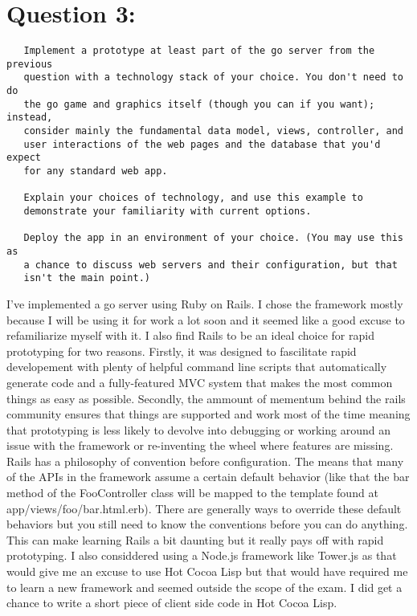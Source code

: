 \documentclass[11pt]{article}
\begin{document}
  
\section*{Question 3:}
\label{sec-3}

  
\begin{verbatim}
   Implement a prototype at least part of the go server from the previous
   question with a technology stack of your choice. You don't need to do
   the go game and graphics itself (though you can if you want); instead,
   consider mainly the fundamental data model, views, controller, and
   user interactions of the web pages and the database that you'd expect
   for any standard web app. 
   
   Explain your choices of technology, and use this example to
   demonstrate your familiarity with current options.
   
   Deploy the app in an environment of your choice. (You may use this as
   a chance to discuss web servers and their configuration, but that
   isn't the main point.)
\end{verbatim}

  
  I've implemented a go server using Ruby on Rails.  I chose the
  framework mostly because I will be using it for work a lot soon and
  it seemed like a good excuse to refamiliarize myself with it.  I
  also find Rails to be an ideal choice for rapid prototyping for two
  reasons.  Firstly, it was designed to fascilitate rapid developement
  with plenty of helpful command line scripts that automatically
  generate code and a fully-featured MVC system that makes the most
  common things as easy as possible.  Secondly, the ammount of
  mementum behind the rails community ensures that things are
  supported and work most of the time meaning that prototyping is less
  likely to devolve into debugging or working around an issue with the
  framework or re-inventing the wheel where features are missing.
  Rails has a philosophy of convention before configuration.  The
  means that many of the APIs in the framework assume a certain
  default behavior (like that the bar method of the FooController
  class will be mapped to the template found at
  app/views/foo/bar.html.erb).  There are generally ways to override
  these default behaviors but you still need to know the conventions
  before you can do anything.  This can make learning Rails a bit
  daunting but it really pays off with rapid prototyping.  I also
  considdered using a Node.js framework like Tower.js as that would
  give me an excuse to use Hot Cocoa Lisp but that would have required
  me to learn a new framework and seemed outside the scope of the
  exam.  I did get a chance to write a short piece of client side code
  in Hot Cocoa Lisp. \\
  
\end{document}
